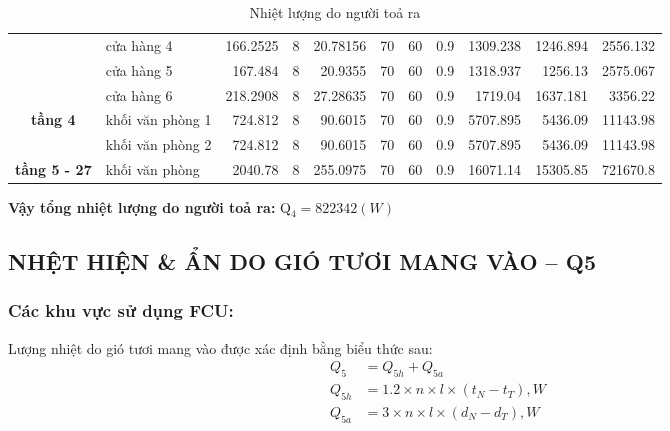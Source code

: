 \begin{landscape}
\begin{table}[H]
\begin{adjustbox}{width=1.5\textheight, height=0.4\textwidth}
\begin{tabular}{|c|l|r|r|r|r|r|r|r|r|r|}
		\cline{2-11}             & cửa hàng 4 & 166.2525 & 8        & 20.78156 & 70       & 60       & 0.9      & 1309.238 & 1246.894 & 2556.132 \bigstrut\\
		\cline{2-11}             & cửa hàng 5 & 167.484  & 8        & 20.9355  & 70       & 60       & 0.9      & 1318.937 & 1256.13  & 2575.067 \bigstrut\\
		\cline{2-11}             & cửa hàng 6 & 218.2908 & 8        & 27.28635 & 70       & 60       & 0.9      & 1719.04  & 1637.181 & 3356.22 \bigstrut\\
		\hline
		\multirow{2}[4]{*}{\textbf{tầng 4}} & khối văn phòng 1 & 724.812  & 8        & 90.6015  & 70       & 60       & 0.9      & 5707.895 & 5436.09  & 11143.98 \bigstrut\\
		\cline{2-11}             & khối văn phòng 2 & 724.812  & 8        & 90.6015  & 70       & 60       & 0.9      & 5707.895 & 5436.09  & 11143.98 \bigstrut\\
		\hline
		\textbf{tầng 5 - 27} & khối văn phòng & 2040.78  & 8        & 255.0975 & 70       & 60       & 0.9      & 16071.14 & 15305.85 & 721670.8 \bigstrut\\
		\hline
	\end{tabular}%
	\end{adjustbox}
	\caption{Nhiệt lượng do người toả ra}
	\label{b:ndn}%
\end{table}%
\end{landscape}
\textbf{Vậy tổng nhiệt lượng do người toả ra:} Q$_{4} = 822342(W)$

\subsection{NHỆT HIỆN \& ẨN DO GIÓ TƯƠI MANG VÀO -- Q{\scriptsize 5}}
\subsubsection{Các khu vực sử dụng FCU:}
Lượng nhiệt do gió tươi mang vào được xác định bằng biểu thức sau:
\begin{equation*}
	\begin{split}
	Q_{5} &= Q_{5h} + Q_{5a} \\
	Q_{5h} &= 1.2 \times n \times l \times (t_{N} - t_{T}), W \\
	Q_{5a} &= 3 \times n \times l \times (d_{N} - d_{T}), W
	\end{split}
\end{equation*}

